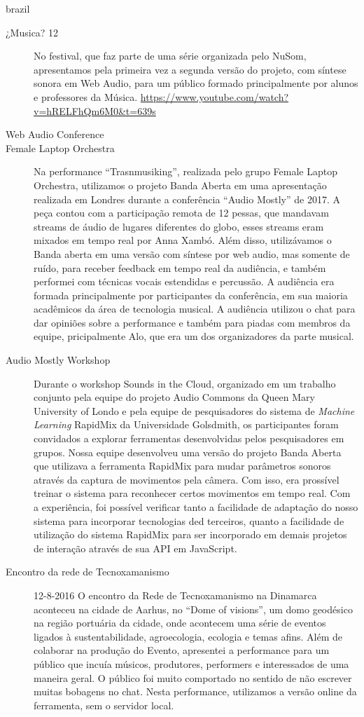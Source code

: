 \begin{otherlanguage*}{brazil}
\begin{description}
\item[¿Musica? 12]
No festival, que faz parte de uma série organizada pelo NuSom, apresentamos pela primeira vez a segunda versão do projeto, com síntese sonora em Web Audio, para um público formado principalmente por alunos e professores da Música. 
\url{https://www.youtube.com/watch?v=hRELFhQm6M0&t=639s}


\item[Web Audio Conference] 


\item[Female Laptop Orchestra]
Na performance ``Trasnmusiking'', realizada pelo grupo Female Laptop Orchestra, utilizamos o projeto Banda Aberta em uma apresentação realizada em Londres durante a conferência ``Audio Mostly'' de 2017. A peça contou com a participação remota de 12 pessas, que mandavam streams de áudio de lugares diferentes do globo, esses streams eram mixados em tempo real por Anna Xambó. Além disso, utilizávamos o Banda aberta em uma versão com síntese por web audio, mas somente de ruído, para receber feedback em tempo real da audiência, e também performei com técnicas vocais estendidas e percussão. A audiência era formada principalmente por participantes da conferência, em sua maioria acadêmicos da área de tecnologia musical. A audiência utilizou o chat para dar opiniões sobre a performance e também para piadas com membros da equipe, pricipalmente Alo, que era um dos organizadores da parte musical.


\item[Audio Mostly Workshop]
Durante o workshop Sounds in the Cloud, organizado em um trabalho conjunto pela equipe do projeto Audio Commons da Queen Mary University of Londo e pela equipe de pesquisadores do sistema de \emph{Machine Learning} RapidMix da Universidade Golsdmith, os participantes foram convidados a explorar ferramentas desenvolvidas pelos pesquisadores em grupos. Nossa equipe desenvolveu uma versão do projeto Banda Aberta que utilizava a ferramenta RapidMix para mudar parâmetros sonoros através da captura de movimentos pela câmera. Com isso, era prossível treinar o sistema para reconhecer certos movimentos em tempo real. Com a experiência, foi possível verificar tanto a facilidade de adaptação do nosso sistema para incorporar tecnologias ded terceiros, quanto a facilidade de utilização do sistema RapidMix para ser incorporado em demais projetos de interação através de sua API em JavaScript.

\item[Encontro da rede de Tecnoxamanismo] 12-8-2016
O encontro da Rede de Tecnoxamanismo na Dinamarca aconteceu na cidade de Aarhus, no ``Dome of visions'', um domo geodésico na região portuária da cidade, onde acontecem uma série de eventos ligados à sustentabilidade, agroecologia, ecologia e temas afins. Além de colaborar na produção do Evento, apresentei a performance para um público que incuía músicos, produtores, performers e interessados de uma maneira geral. O público foi muito comportado no sentido de não escrever muitas bobagens no chat. Nesta performance, utilizamos a versão online da ferramenta, sem o servidor local.



\end{description}
\end{otherlanguage*}

